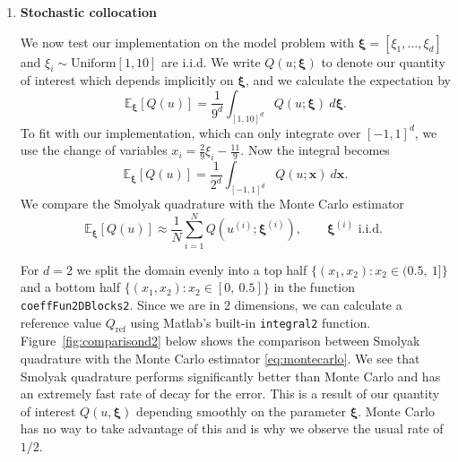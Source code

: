 \documentclass[12pt]{article}
\begin{document}
\begin{enumerate}
\item {\large \textbf{Stochastic collocation}}

\hspace{0.5cm}  We now test our implementation on the model problem with ${\bm \xi} = [\xi_1,\ldots, \xi_d]$ and $\xi_i \sim \text{Uniform}[1,10]$ are i.i.d.  We write $Q(u; {\bm \xi})$ to denote our quantity of interest which depends implicitly on ${\bm \xi}$, and we calculate the expectation by
\begin{equation}
\label{eq:expectation}
\mathbb{E}_{\bm \xi}[Q(u)] = \frac{1}{9^d} \int_{[1,10]^d} Q(u; {\bm \xi})\ d{\bm \xi}.
\end{equation}
To fit with our implementation, which can only integrate over $[-1,1]^d$, we use the change of variables $x_i = \frac{2}{9}\xi_i - \frac{11}{9}$.  Now the integral becomes
\begin{equation}
\label{eq:change_of_variables}
\mathbb{E}_{\bm \xi}[Q(u)] = \frac{1}{2^d} \int_{[-1,1]^d} Q(u; {\bm x})\ d{\bm x}.
\end{equation}
We compare the Smolyak quadrature with the Monte Carlo estimator
\begin{equation}
\label{eq:montecarlo}
\mathbb{E}_{\bm \xi}[Q(u)] \approx \frac{1}{N}\sum_{i=1}^N Q(u^{(i)}; {\bm \xi}^{(i)}), \quad \quad {\bm \xi}^{(i)} \text{ i.i.d. }
\end{equation}


\hspace{0.5cm} For $d=2$ we split the domain evenly into a top half $\{(x_1,x_2) : x_2 \in (0.5,\ 1]\} $ and a bottom half $\{(x_1,x_2) : x_2 \in [0,\ 0.5]\}$ in the function {\tt coeffFun2DBlocks2}.  Since we are in 2 dimensions, we can calculate a reference value $Q_{\text{ref}}$ using Matlab's built-in {\tt integral2} function.  Figure~\ref{fig:comparisond2} below shows the comparison between Smolyak quadrature with the Monte Carlo estimator \ref{eq:montecarlo}.  We see that Smolyak quadrature performs significantly better than Monte Carlo and has an extremely fast rate of decay for the error.  This is a result of our quantity of interest $Q(u, {\bm \xi})$ depending smoothly on the parameter ${\bm \xi}$.  Monte Carlo has no way to take advantage of this and is why we observe the usual rate of $1/2$.



\end{enumerate}
\end{document}
